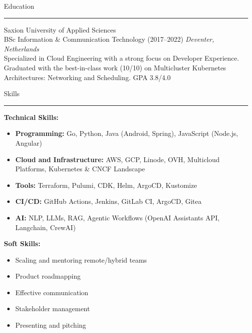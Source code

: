 \documentclass[10pt,a4paper]{article}
\newcommand{\CVSection}[1]{%
  \vspace{8pt}%
  {\headingfont\textcolor{techBlue}{#1}}\\
  \rule{\linewidth}{0.5pt}%
  \vspace{4pt}%
}
\begin{document}
\begin{minipage}[t]{0.34\textwidth}
  \CVSection{Education}
  {\headingfont Saxion University of Applied Sciences \\
  \hfill BSc Information \& Communication Technology (2017--2022)} 
  \textit{Deventer, Netherlands} \\
  Specialized in Cloud Engineering with a strong focus on Developer Experience. 
  Graduated with the best-in-class work (10/10) on Multicluster Kubernetes Architectures: Networking and Scheduling. 
  GPA 3.8/4.0

  \CVSection{Skills}
  \textbf{Technical Skills:}
  \begin{itemize}[leftmargin=*]
    \item \textbf{Programming:} Go, Python, Java (Android, Spring), JavaScript (Node.js, Angular)
    \item \textbf{Cloud and Infrastructure:} AWS, GCP, Linode, OVH, Multicloud Platforms, Kubernetes \& CNCF Landscape
    \item \textbf{Tools:} Terraform, Pulumi, CDK, Helm, ArgoCD, Kustomize
    \item \textbf{CI/CD:} GitHub Actions, Jenkins, GitLab CI, ArgoCD, Gitea
    \item \textbf{AI:} NLP, LLMs, RAG, Agentic Workflows (OpenAI Assistants API, Langchain, CrewAI)
  \end{itemize}

  \textbf{Soft Skills:}
  \begin{itemize}[leftmargin=*]
    \item Scaling and mentoring remote/hybrid teams
    \item Product roadmapping
    \item Effective communication
    \item Stakeholder management
    \item Presenting and pitching
  \end{itemize}
\end{minipage}

\end{document}
